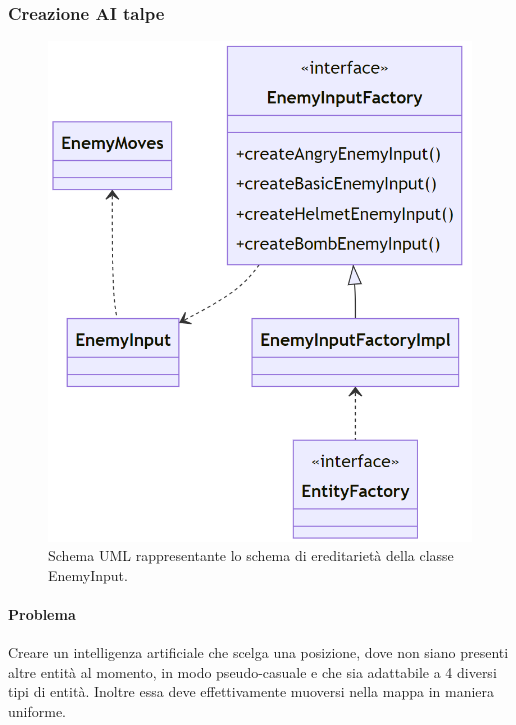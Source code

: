 \documentclass[a4paper,12pt]{report}
\begin{document}
\subsubsection{Creazione AI talpe}
\begin{figure}[H]
\centering{}
\includegraphics[scale = 0.5]{img/EnemyInputs.PNG}
\caption{Schema UML rappresentante lo schema di ereditarietà della classe EnemyInput.}
\end{figure}

\paragraph{Problema}
    Creare un intelligenza artificiale che scelga una posizione, dove non siano presenti altre entità al momento, in modo 
    pseudo-casuale e che sia adattabile a 4 diversi tipi di entità. Inoltre essa deve effettivamente muoversi nella mappa 
    in maniera uniforme.
\end{document}
